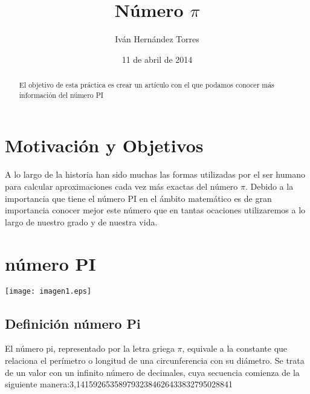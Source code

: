 \documentclass[spanish,a4paper,10pt]{article}
\begin{document}
\title{Número $\pi$}
\author{Iván Hernández Torres}
\date{11 de abril de 2014}

\maketitle

\begin{abstract}
El objetivo de esta práctica es crear un artículo con el que podamos conocer más información del número PI
\end{abstract}

\section{Motivación y Objetivos}

A lo largo de la historia han sido muchas las formas utilizadas por el
ser humano para calcular aproximaciones cada vez más exactas del número $\pi$.
%
Debido a la importancia que tiene el número PI en el ámbito matemático es de gran importancia conocer mejor este número
que en tantas ocaciones utilizaremos a lo largo de nuestro grado y de nuestra vida.
%
\section{número PI}
\texttt{[image: imagen1.eps]}

\subsection{Definición número Pi}
El número pi, representado por la letra griega $\pi$, equivale a la constante que relaciona el perímetro o longitud de una
circunferencia con su diámetro. Se trata de un valor con un infinito número de decimales, cuya secuencia comienza de
la siguiente manera:3,1415926535897932384626433832795028841
\end{document}
